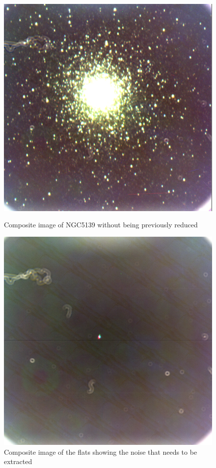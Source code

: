 \begin{figure}[H]
  \centering
  \begin{minipage}[b]{0.47\textwidth}
    \includegraphics[width=\textwidth]{images/ngc_5139_dirty.png}
    \caption[Dirty image of NGC5139]{Composite image of NGC5139 without being previously reduced}
  \end{minipage}
  \hfill
  \begin{minipage}[b]{0.47\textwidth}
    \includegraphics[width=\textwidth]{images/ruido.png}
    \caption[Clean image of NGC5139]{Composite image of the flats showing the noise that needs to be extracted}
  \end{minipage}
\end{figure}

